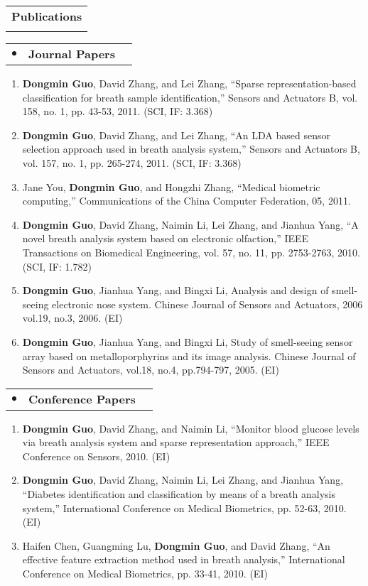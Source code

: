 \documentclass[letterpaper,11pt]{report}
\makeatletter
\newcommand{\resheading}[1]{
\vspace{6pt}\begin{tabular*}{6.71in}{l@{\extracolsep{\fill}}}
        \large {\textbf{#1}} \\
        \Xhline{1.2pt}
\end{tabular*}\vspace{-2pt}}
\newcommand{\ressubheadingtwo}[1]{
\begin{tabular*}{6.9in}{ll@{\extracolsep{\fill}}r}
        \hspace{0.15in} $\bullet$ \hspace{0.05in} & \textbf{#1}\\
\end{tabular*}\vspace{-4pt}}
\makeatother
\begin{document}
\resheading{Publications}
\begin{description}
\item \ressubheadingtwo{\bf{Journal Papers}}
\begin{enumerate}
        \item {\bf{Dongmin Guo}}, David Zhang, and Lei Zhang, ``Sparse representation-based classification for breath sample identification,'' Sensors and Actuators B, vol. 158, no. 1, pp. 43-53, 2011. (SCI, IF: 3.368)
        \item {\bf{Dongmin Guo}}, David Zhang, and Lei Zhang, ``An LDA based sensor selection approach used in breath analysis system,'' Sensors and Actuators B, vol. 157, no. 1, pp. 265-274, 2011. (SCI, IF: 3.368)
        \item Jane You, {\bf{Dongmin Guo}}, and Hongzhi Zhang, ``Medical biometric computing,'' Communications of the China Computer Federation, 05, 2011.
        \item {\bf{Dongmin Guo}}, David Zhang, Naimin Li, Lei Zhang, and Jianhua Yang, ``A novel breath analysis system based on electronic olfaction,'' IEEE Transactions on Biomedical Engineering, vol. 57, no. 11, pp. 2753-2763, 2010. (SCI, IF: 1.782)
        \item {\bf{Dongmin Guo}}, Jianhua Yang, and Bingxi Li, Analysis and design of smell-seeing electronic nose system. Chinese Journal of Sensors and Actuators, 2006 vol.19, no.3, 2006. (EI)
        \item {\bf{Dongmin Guo}}, Jianhua Yang, and Bingxi Li, Study of smell-seeing sensor array based on metalloporphyrins and its image analysis. Chinese Journal of Sensors and Actuators, vol.18, no.4, pp.794-797, 2005. (EI)
\end{enumerate}

\item \ressubheadingtwo{\bf{Conference Papers}}
\begin{enumerate}
        \item {\bf{Dongmin Guo}}, David Zhang, and Naimin Li, ``Monitor blood glucose levels via breath analysis system and sparse representation approach,'' IEEE Conference on Sensors, 2010. (EI)
        \item {\bf{Dongmin Guo}}, David Zhang, Naimin Li, Lei Zhang, and Jianhua Yang, ``Diabetes identification and classification by means of a breath analysis system,'' International Conference on Medical Biometrics, pp. 52-63, 2010. (EI)
        \item Haifen Chen, Guangming Lu, {\bf{Dongmin Guo}}, and David Zhang, ``An effective feature extraction method used in breath analysis,'' International Conference on Medical Biometrics, pp. 33-41, 2010. (EI)
    \end{enumerate}


\end{description}
\end{document}
